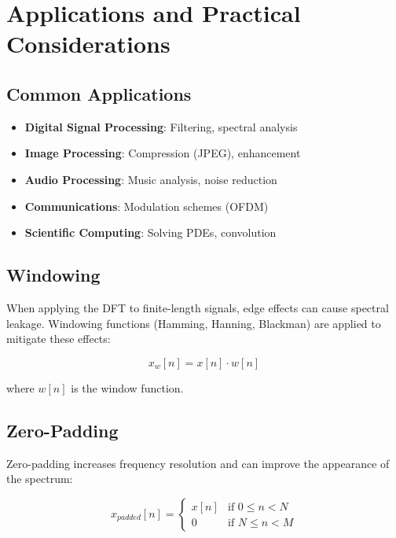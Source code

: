 \documentclass[11pt,a4paper]{article}
\begin{document}
\section{Applications and Practical Considerations}

\subsection{Common Applications}

\begin{itemize}
    \item \textbf{Digital Signal Processing}: Filtering, spectral analysis
    \item \textbf{Image Processing}: Compression (JPEG), enhancement
    \item \textbf{Audio Processing}: Music analysis, noise reduction
    \item \textbf{Communications}: Modulation schemes (OFDM)
    \item \textbf{Scientific Computing}: Solving PDEs, convolution
\end{itemize}

\subsection{Windowing}

When applying the DFT to finite-length signals, edge effects can cause spectral leakage. Windowing functions (Hamming, Hanning, Blackman) are applied to mitigate these effects:

\begin{equation}
x_w[n] = x[n] \cdot w[n]
\end{equation}

where $w[n]$ is the window function.

\subsection{Zero-Padding}

Zero-padding increases frequency resolution and can improve the appearance of the spectrum:

\begin{equation}
x_{padded}[n] = \begin{cases}
x[n] & \text{if } 0 \leq n < N \\
0 & \text{if } N \leq n < M
\end{cases}
\end{equation}
\end{document}
